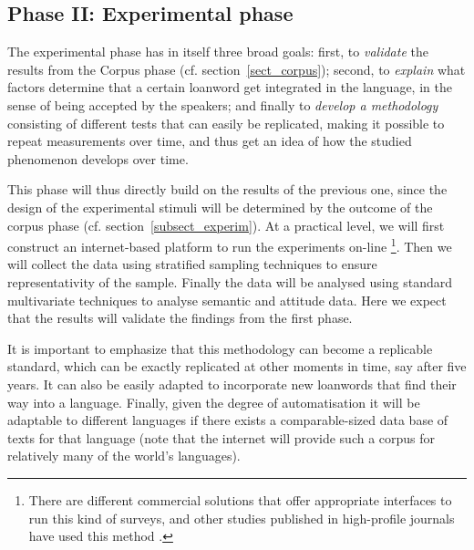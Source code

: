 \documentclass[a4paper]{article}
\begin{document}

\subsection{Phase II: Experimental phase}

The experimental phase has in itself three broad goals:
first, to \emph{validate} the results from the Corpus phase (cf. section~\ref{sect_corpus});
second, to \emph{explain} what factors determine that a certain loanword get integrated in the language, in the sense of being accepted by the speakers;
and finally to \emph{develop a methodology} consisting of different tests that can easily be replicated, making it possible to repeat measurements over time, and thus get an idea of how the studied phenomenon develops over time.

This phase will thus directly build on the results of the previous one, since the design of the experimental stimuli will be determined by the outcome of the corpus phase (cf. section~\ref{subsect_experim}).
At a practical level, we will first construct an internet-based platform to run the experiments on-line%
\footnote{There are different commercial solutions that offer appropriate interfaces to run this kind of surveys, and other studies published in high-profile journals have used this method \citep[e.g.,][]{Scontras2012}.}.
Then we will collect the data using stratified sampling techniques to ensure representativity of the sample.
Finally the data will be analysed using standard multivariate techniques to analyse semantic and attitude data.
Here we expect that the results will validate the findings from the first phase.

It is important to emphasize that this methodology can become a replicable standard, which can be exactly replicated at other moments in time, say after five years. 
It can also be easily adapted to incorporate new loanwords that find their way into a language.
Finally, given the degree of automatisation it will be adaptable to different languages if there exists a comparable-sized data base of texts for that language (note that the internet will provide such a corpus for relatively many of the world's languages).
\end{document}
